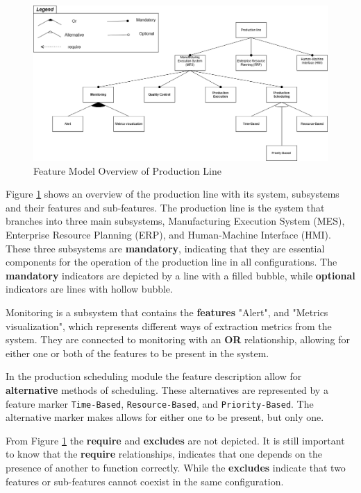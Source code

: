 \begin{figure}[H]
    \centering
    \caption{Feature Model Overview of Production Line}
    \label{fig:feature-model}
    \includegraphics[width=1\linewidth]{images/feature_modelling.png}
\end{figure}

Figure \ref{fig:feature-model} shows an overview of the production line with its system, subsystems and their features and sub-features. The production line is the system that branches into three main subsystems, Manufacturing Execution System (MES), Enterprise Resource Planning (ERP), and Human-Machine Interface (HMI). These three subsystems are \textbf{mandatory}, indicating that they are essential components for the operation of the production line in all configurations. The \textbf{mandatory} indicators are depicted by a line with a filled bubble, while \textbf{optional} indicators are lines with hollow bubble.

Monitoring is a subsystem that contains the \textbf{features} "Alert", and "Metrics visualization", which represents different ways of extraction metrics from the system. They are connected to monitoring with an \textbf{OR} relationship, allowing for either one or both of the features to be present in the system.

In the production scheduling module the feature description allow for \textbf{alternative} methods of scheduling. These alternatives are represented by a feature marker \texttt{Time-Based}, \texttt{Resource-Based}, and \texttt{Priority-Based}. The alternative marker makes allows for either one to be present, but only one.

From Figure \ref{fig:feature-model} the \textbf{require} and \textbf{excludes} are not depicted. It is still important to know that the \textbf{require} relationships, indicates that one depends on the presence of another to function correctly. While the \textbf{excludes} indicate that two features or sub-features cannot coexist in the same configuration.

